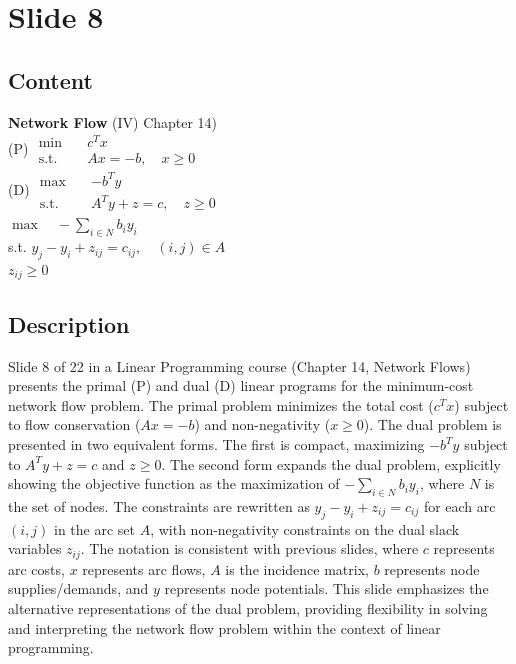 \documentclass{article}%
\begin{document}
%
\newpage%
\section{Slide 8}%
\label{sec:Slide8}%
\subsection{Content}%

\textbf{Network Flow} (IV) Chapter 14) \\
(P) \quad $\begin{aligned} \min \quad & c^T x \\ \text{s.t.} \quad & Ax = -b, \quad x \ge 0 \end{aligned}$ \\
(D) \quad $\begin{aligned} \max \quad & -b^T y \\ \text{s.t.} \quad & A^T y + z = c, \quad z \ge 0 \end{aligned}$ \\
$\max \quad - \sum_{i \in N} b_i y_i$ \\
s.t. \quad $y_j - y_i + z_{ij} = c_{ij}, \quad (i,j) \in A$ \\
$z_{ij} \ge 0$
%
\subsection{Description}%
Slide 8 of 22 in a Linear Programming course (Chapter 14, Network Flows) presents the primal (P) and dual (D) linear programs for the minimum-cost network flow problem.  The primal problem minimizes the total cost ($c^T x$) subject to flow conservation ($Ax = -b$) and non-negativity ($x \ge 0$).  The dual problem is presented in two equivalent forms. The first is compact, maximizing $-b^T y$ subject to $A^T y + z = c$ and $z \ge 0$. The second form expands the dual problem, explicitly showing the objective function as the maximization of $-\sum_{i \in N} b_i y_i$, where $N$ is the set of nodes. The constraints are rewritten as $y_j - y_i + z_{ij} = c_{ij}$ for each arc $(i,j)$ in the arc set $A$, with non-negativity constraints on the dual slack variables $z_{ij}$.  The notation is consistent with previous slides, where $c$ represents arc costs, $x$ represents arc flows, $A$ is the incidence matrix, $b$ represents node supplies/demands, and $y$ represents node potentials. This slide emphasizes the alternative representations of the dual problem, providing flexibility in solving and interpreting the network flow problem within the context of linear programming.%
\end{document}
